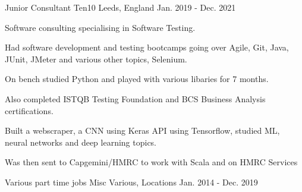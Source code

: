 \begin{cventries}
{\begin{cvitems}
      \end{cvitems}
    }
    \cventry
    {Junior Consultant} 
    {Ten10} 
    {Leeds, England} 
    {Jan. 2019 - Dec. 2021}
    {
      \raggedright
      \begin{cvitems}
        \item {Software consulting specialising in Software Testing.}
        \item {Had software development and testing bootcamps going over Agile, Git, Java, JUnit, JMeter and various other topics, Selenium.}
        \item {On bench studied Python and played with various libaries for 7 months.}
        \item {Also completed ISTQB Testing Foundation and BCS Business Analysis certifications.}
        \item {Built a webscraper, a CNN using Keras API using Tensorflow, studied ML, neural networks and deep learning topics.}
        \item {Was then sent to Capgemini/HMRC to work with Scala and on HMRC Services}
      \end{cvitems}
    }    

\cventry
    {Various part time jobs} 
    {Misc} 
    {Various, Locations} 
    {Jan. 2014 - Dec. 2019}
    {}      

\end{cventries}
